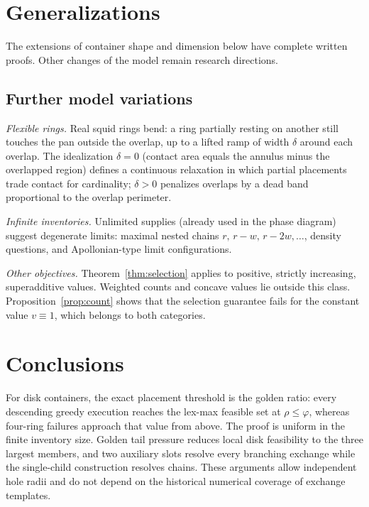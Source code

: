 \documentclass[11pt]{article}
\theoremstyle{definition}
\begin{document}
\section{Generalizations}\label{sec:general}

The extensions of container shape and dimension below have complete
written proofs. Other changes of the model remain research directions.




\subsection{Further model variations}
\emph{Flexible rings.} Real squid rings bend: a ring partially resting on
another still touches the pan outside the overlap, up to a lifted ramp of
width $\delta$ around each overlap. The idealization $\delta=0$ (contact area
equals the annulus minus the overlapped region) defines a continuous
relaxation in which partial placements trade contact for cardinality; $\delta>0$
penalizes overlaps by a dead band proportional to the overlap perimeter.

\emph{Infinite inventories.} Unlimited supplies (already used in the
phase diagram) suggest degenerate limits: maximal nested chains
$r,\,r-w,\,r-2w,\dots$, density questions, and Apollonian-type limit
configurations.

\emph{Other objectives.} Theorem~\ref{thm:selection} applies to positive,
strictly increasing, superadditive values. Weighted counts and concave
values lie outside this class. Proposition~\ref{prop:count} shows that
the selection guarantee fails for the constant value $v\equiv1$,
which belongs to both categories.

\section{Conclusions}\label{sec:conclusions}

For disk containers, the exact placement threshold is the golden ratio:
every descending greedy execution reaches the lex-max feasible set at
$\rho\le\varphi$, whereas four-ring failures approach that value from
above. The proof is uniform in the finite inventory size. Golden tail
pressure reduces local disk feasibility to the three largest members,
and two auxiliary slots resolve every branching exchange while the
single-child construction resolves chains. These arguments allow
independent hole radii and do not depend on the historical numerical
coverage of exchange templates.
\end{document}
